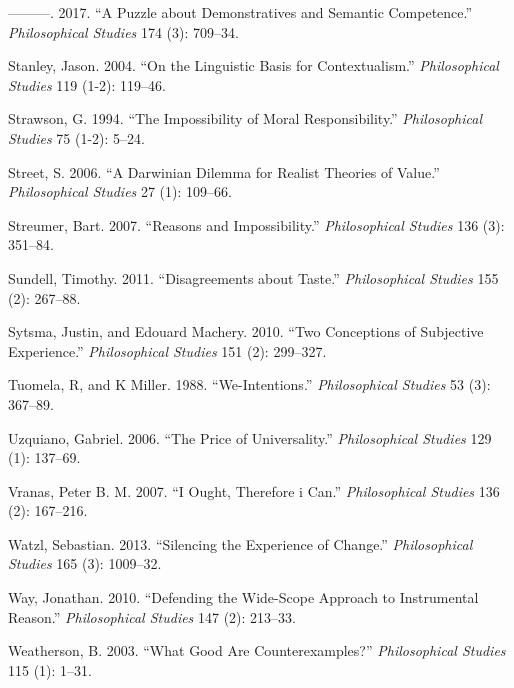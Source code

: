 \documentclass[
  10pt,
  letterpaper,
  DIV=11,
  numbers=noendperiod,
  twoside]{scrartcl}
\newlength{\cslhangindent}
\newenvironment{CSLReferences}[2] %
 {\begin{list}{}{%
  \setlength{\itemindent}{0pt}
  \setlength{\leftmargin}{0pt}
  \setlength{\parsep}{0pt}
  \ifodd #1
   \setlength{\leftmargin}{\cslhangindent}
   \setlength{\itemindent}{-1\cslhangindent}
  \fi
  \setlength{\itemsep}{#2\baselineskip}}}
 {\end{list}}
\begin{document}
\begin{CSLReferences}{1}{0}
---------. 2017. {``A Puzzle about Demonstratives and Semantic
Competence.''} \emph{Philosophical Studies} 174 (3): 709--34.

Stanley, Jason. 2004. {``On the Linguistic Basis for Contextualism.''}
\emph{Philosophical Studies} 119 (1-2): 119--46.

Strawson, G. 1994. {``The Impossibility of Moral Responsibility.''}
\emph{Philosophical Studies} 75 (1-2): 5--24.

Street, S. 2006. {``A Darwinian Dilemma for Realist Theories of
Value.''} \emph{Philosophical Studies} 27 (1): 109--66.

Streumer, Bart. 2007. {``Reasons and Impossibility.''}
\emph{Philosophical Studies} 136 (3): 351--84.

Sundell, Timothy. 2011. {``Disagreements about Taste.''}
\emph{Philosophical Studies} 155 (2): 267--88.

Sytsma, Justin, and Edouard Machery. 2010. {``Two Conceptions of
Subjective Experience.''} \emph{Philosophical Studies} 151 (2):
299--327.

Tuomela, R, and K Miller. 1988. {``We-Intentions.''} \emph{Philosophical
Studies} 53 (3): 367--89.

Uzquiano, Gabriel. 2006. {``The Price of Universality.''}
\emph{Philosophical Studies} 129 (1): 137--69.

Vranas, Peter B. M. 2007. {``I Ought, Therefore i Can.''}
\emph{Philosophical Studies} 136 (2): 167--216.

Watzl, Sebastian. 2013. {``Silencing the Experience of Change.''}
\emph{Philosophical Studies} 165 (3): 1009--32.

Way, Jonathan. 2010. {``Defending the Wide-Scope Approach to
Instrumental Reason.''} \emph{Philosophical Studies} 147 (2): 213--33.

Weatherson, B. 2003. {``What Good Are Counterexamples?''}
\emph{Philosophical Studies} 115 (1): 1--31.


\end{CSLReferences}
\end{document}
